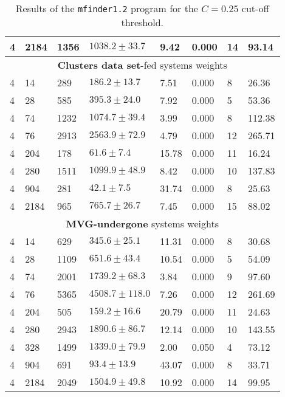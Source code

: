\documentclass[a4paper,12pt]{article}
\begin{document}
\begin{table}[h!]
\begin{center}
\begin{tabular}{||p{1cm} | p{1cm} | p{1cm} | p{2.5cm} | p{1.5cm} | p{1.5cm} | p{1cm} | p{1.5cm}||}
			4 & 2184  &    1356 & $    1038.2\pm33.7$ &      9.42  &    0.000   &   14  &    93.14  \\
			\hline \hline
			\multicolumn{8}{c}{\textbf{Clusters data set}-fed systems weights} \\
			\hline
			4 & 14    &  289   &  $ 186.2\pm13.7    $ &  7.51    &  0.000    &  8     & 26.36       \\
			4 & 28    &  585   &  $ 395.3\pm24.0    $ &  7.92    &  0.000    &  5     & 53.36       \\
			4 & 74    &  1232  &  $  1074.7\pm39.4  $ &    3.99  &    0.000  &    8   &   112.38    \\
			4 & 76    &  2913  &  $  2563.9\pm72.9  $ &    4.79  &    0.000  &    12  &    265.71   \\
			4 & 204   &   178  &  $  61.6\pm7.4     $ &   15.78  &    0.000  &    11  &    16.24    \\
			4 & 280   &   1511 &  $   1099.9\pm48.9 $ &     8.42 &     0.000 &     10 &     137.83  \\
			4 & 904   &   281  &  $  42.1\pm7.5     $ &   31.74  &    0.000  &    8   &   25.63     \\
			4 & 2184  &    965 &  $   765.7\pm26.7  $ &    7.45  &    0.000  &    15  &    88.02    \\
			\hline \hline
			\multicolumn{8}{c}{\textbf{MVG-undergone} systems weights} \\
			\hline
			4 & 14   &   629    & $  345.6\pm25.1     $ & 11.31     & 0.000     & 8     & 30.68      \\
			4 & 28   &   1109   & $   651.6\pm43.4    $ &  10.54    &  0.000    &  5    &  54.09     \\
			4 & 74   &   2001   & $   1739.2\pm68.3   $ &   3.84    &  0.000    &  9    &  97.60     \\ 
			4 & 76   &   5365   & $   4508.7\pm118.0  $ &    7.26   &   0.000   &   12  &    261.69  \\ 
			4 & 204  &    505   & $   159.2\pm16.6    $ &  20.79    &  0.000    &  11   &   24.63    \\ 
			4 & 280  &    2943  & $    1890.6\pm86.7  $ &    12.14  &    0.000  &    10 &     143.55 \\ 
			4 & 328  &    1499  & $    1339.0\pm79.9  $ &    2.00   &   0.050   &   4   &   73.12    \\ 
			4 & 904  &    691   & $   93.4\pm13.9     $ & 43.07     & 0.000     & 8     & 33.71      \\ 
			4 & 2184 &     2049 & $     1504.9\pm49.8 $ &     10.92 &     0.000 &     14&      99.95 \\ 
			\hline
		\end{tabular}
	\end{center}
	\caption{Results of the \texttt{mfinder1.2} program for the $C = 0.25$ cut-off threshold.}
\end{table}
\end{document}
